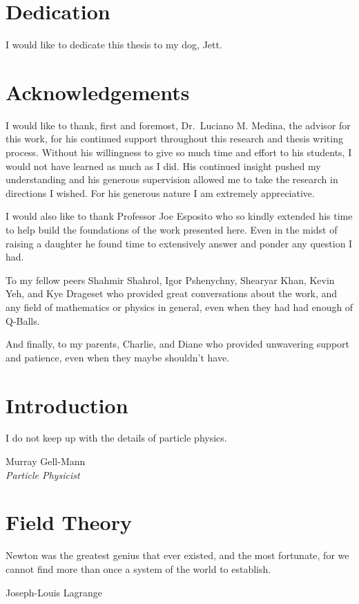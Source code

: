 \documentclass[12pt]{report}
\theoremstyle{definition}
\begin{document}
\thispagestyle{empty}
 
\listoffigures
\begingroup
\let\clearpage\relax
\listoftables
\endgroup

\chapter*{Dedication}
I would like to dedicate this thesis to my dog, Jett.

\chapter*{Acknowledgements}
I would like to thank, first and foremost, Dr.\ Luciano M. Medina, the advisor
for this work, for his continued support throughout this research and thesis
writing process. Without his willingness to give so much time and effort to his
students, I would not have learned as much as I did. His continued insight
pushed my understanding and his generous supervision allowed me to take the
research in directions I wished. For his generous nature I am extremely
appreciative.

I would also like to thank Professor Joe Esposito who so kindly extended his
time to help build the foundations of the work presented here. Even in the midst
of raising a daughter he found time to extensively answer and ponder any
question I had.

To my fellow peers Shahmir Shahrol, Igor Pshenychny, Shearyar Khan, Kevin Yeh,
and Kye Drageset who provided great conversations about the work, and any field
of mathematics or physics in general, even when they had had enough of Q-Balls.

And finally, to my parents, Charlie, and Diane who provided unwavering support
and patience, even when they maybe shouldn't have.


\tableofcontents

\chapter{Introduction}\label{chap:intro}
\epigraph{I do not keep up with the details of particle physics.}{Murray Gell-Mann\\\textit{Particle Physicist}}


\chapter{Field Theory}\label{chap:fields}
\epigraph{Newton was the greatest genius that ever existed, and the most
fortunate, for we cannot find more than once a system of the world to
establish.}{Joseph-Louis Lagrange}

\end{document}
